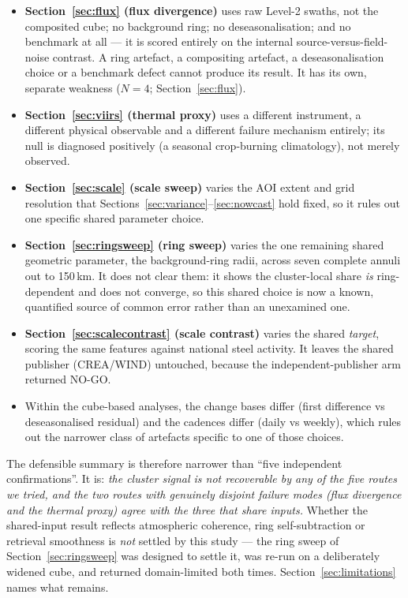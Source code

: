 \documentclass[11pt,a4paper]{article}
\begin{document}
\begin{itemize}[leftmargin=1.4em,itemsep=0.2em]
  \item \textbf{Section~\ref{sec:flux} (flux divergence)} uses raw Level-2 swaths, not the
  composited cube; no background ring; no deseasonalisation; and no benchmark at all --- it is
  scored entirely on the internal source-versus-field-noise contrast. A ring artefact, a
  compositing artefact, a deseasonalisation choice or a benchmark defect cannot produce its
  result. It has its own, separate weakness ($N{=}4$; Section~\ref{sec:flux}).
  \item \textbf{Section~\ref{sec:viirs} (thermal proxy)} uses a different instrument, a different
  physical observable and a different failure mechanism entirely; its null is diagnosed
  positively (a seasonal crop-burning climatology), not merely observed.
  \item \textbf{Section~\ref{sec:scale} (scale sweep)} varies the AOI extent and grid resolution
  that Sections~\ref{sec:variance}--\ref{sec:nowcast} hold fixed, so it rules out one specific
  shared parameter choice.
  \item \textbf{Section~\ref{sec:ringsweep} (ring sweep)} varies the one remaining shared geometric
  parameter, the background-ring radii, across seven complete annuli out to 150\,km. It does not
  clear them: it shows the cluster-local share \emph{is} ring-dependent and does not converge, so
  this shared choice is now a known, quantified source of common error rather than an unexamined
  one.
  \item \textbf{Section~\ref{sec:scalecontrast} (scale contrast)} varies the shared \emph{target},
  scoring the same features against national steel activity. It leaves the shared publisher
  (CREA/WIND) untouched, because the independent-publisher arm returned NO-GO.
  \item Within the cube-based analyses, the change bases differ (first difference vs
  deseasonalised residual) and the cadences differ (daily vs weekly), which rules out the
  narrower class of artefacts specific to one of those choices.
\end{itemize}

\noindent The defensible summary is therefore narrower than ``five independent confirmations''. It
is: \emph{the cluster signal is not recoverable by any of the five routes we tried, and the two
routes with genuinely disjoint failure modes (flux divergence and the thermal proxy) agree with
the three that share inputs.} Whether the shared-input result reflects atmospheric coherence, ring
self-subtraction or retrieval smoothness is \emph{not} settled by this study --- the ring sweep of
Section~\ref{sec:ringsweep} was designed to settle it, was re-run on a deliberately widened cube,
and returned domain-limited both times.
Section~\ref{sec:limitations} names what remains.
\end{document}
